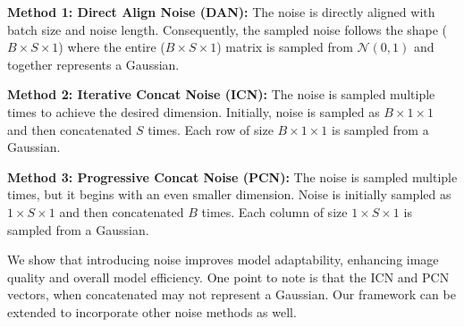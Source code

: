 \documentclass[letterpaper]{article}
\begin{document}
\textbf{Method 1: Direct Align Noise (DAN):} The noise is directly aligned with batch size and noise length. Consequently, the sampled noise follows the shape (\(B \times S \times 1\)) where the entire (\(B \times S \times 1\)) matrix is sampled from $\mathcal{N}(0,1)$ and together represents a Gaussian.

\textbf{Method 2: Iterative Concat Noise (ICN):} The noise is sampled multiple times to achieve the desired dimension. Initially, noise is sampled as \(B \times 1 \times 1\) and then concatenated \(S\) times. Each row of size \(B \times 1 \times 1\) is sampled from a Gaussian.

\textbf{Method 3: Progressive Concat Noise (PCN):} The noise is sampled multiple times, but it begins with an even smaller dimension. Noise is initially sampled as \(1 \times S \times 1\) and then concatenated \(B\) times. Each column of size \(1 \times S \times 1\) is sampled from a Gaussian.


We show that introducing noise improves model adaptability, enhancing image quality and overall model efficiency.
One point to note is that the ICN and PCN vectors, when concatenated may not represent a Gaussian. Our framework can be extended to incorporate other noise methods as well.
\end{document}
